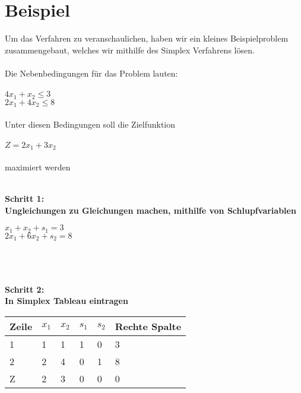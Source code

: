 \section{Beispiel}
Um das Verfahren zu veranschaulichen, haben wir ein kleines Beispielproblem zusammengebaut, welches wir mithilfe des Simplex Verfahrens lösen.\\~\\
Die Nebenbedingungen für das Problem lauten:\\~\\
\(4x_1+x_2\le3\)\\
\(2x_1+4x_2\le8\)\\~\\
Unter diesen Bedingungen soll die Zielfunktion\\~\\
\(Z = 2x_1+ 3x_2\)\\~\\
maximiert werden\\
\\
\begin{center}
    
\textbf{Schritt 1: \\Ungleichungen zu Gleichungen machen, mithilfe von Schlupfvariablen }\end{center}

\(x_1+x_2+s_1=3\)\\
\(2x_1+6x_2+s_2=8\)\\~\\~\\~\\
\begin{center}
\textbf{Schritt 2:\\In Simplex Tableau eintragen}\\\end{center}
\begin{table}[h]
\begin{tabular}{|l|l|l|l|l|l|}
\hline
\rowcolor[HTML]{C0C0C0} 
Zeile                     & $x_1$ & $x_2$ & $s_1$ & $s_2$ & Rechte Spalte \\ \hline
\cellcolor[HTML]{C0C0C0}1 & 1  & 1  & 1  & 0  & 3             \\ \hline
\cellcolor[HTML]{C0C0C0}2 & 2  & 4  & 0  & 1  & 8             \\ \hline
\cellcolor[HTML]{C0C0C0}Z & 2  & 3  & 0  & 0  & 0             \\ \hline
\end{tabular}
\end{table}

